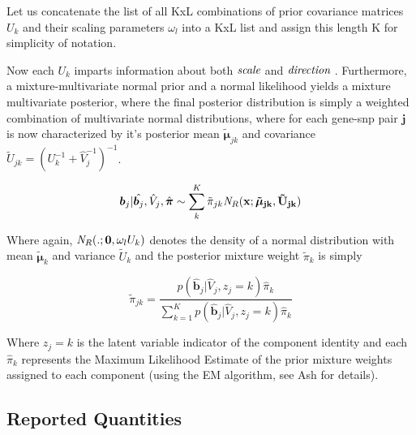 \begin{enumerate}
Let us concatenate the list of all KxL combinations of prior covariance matrices $U_{k}$ and their scaling parameters $\omega_{l}$ into a KxL list and assign this length K for simplicity of notation.

Now each $U_{k}$ imparts information about both $\emph{scale}$ and $\emph{direction}$
. 
Furthermore, a mixture-multivariate normal prior and a normal likelihood yields a mixture multivariate posterior, where the final posterior distribution is simply a weighted combination of multivariate normal distributions, where for each gene-snp pair $\textbf{j}$ is now characterized by it's posterior mean $\tilde{\bm{\mu}}_{jk}$ and covariance  $\tilde{U}_{jk} = (U_{k}^{-1} + \hat{V}_{j}^{-1})^{-1}$.

\begin{equation}
\begin{aligned}
  \label{eq:mixpost}
\bm{b}_{j} | \hat{\bm{b}_{j}}, \hat{V}_{j}, \hat{\bm{\pi}} 
\sim \sum_{k}^{K}  \tilde \pi_{jk} {\it N}_R (\bf{x};\bm{\tilde{\mu}}_{jk},\tilde{U} _{jk} )%


\end{aligned}
\end{equation}

Where again, ${\it N}_R(.; \bm{0}, \omega_l U_{k})$ denotes the density of a normal distribution with mean $\bm{\tilde{\mu}}_{k}$ and variance $\tilde{U} _{k}$ and the posterior mixture weight $\tilde \pi_{k}$ is simply 



 \begin{equation}
 \label{post.pi}
\tilde \pi_{jk} =\frac{ p(\hat{\bm{b}}_{j}| \hat{V}_{j}, z_{j}=k) \hat \pi_{k} } {\sum_{k=1}^{K} p(\hat{\bm{b}}_{j}| \hat{V}_{j}, z_{j}=k) \hat\pi_{k}}
\end{equation}

Where $z_{j}=k$ is the latent variable indicator of the component identity and each $\hat\pi_{k}$ represents the Maximum Likelihood Estimate of the prior mixture weights assigned to each component (using the EM algorithm, see Ash for details).


\subsection{Reported Quantities}


\end{enumerate}
